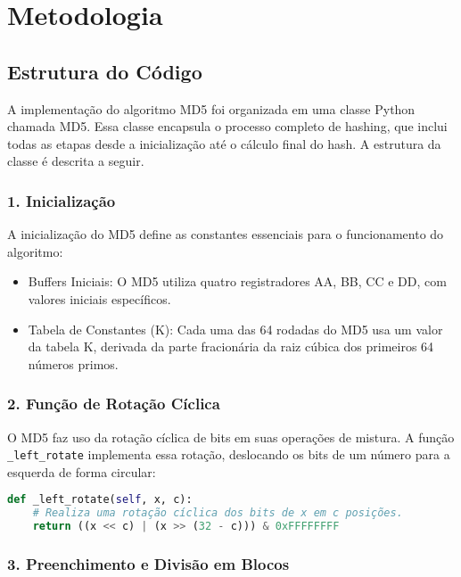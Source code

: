 \documentclass{article}
\begin{document}
\section*{Metodologia}

\subsection*{Estrutura do Código}

A implementação do algoritmo MD5 foi organizada em uma classe Python chamada MD5. Essa classe encapsula o processo completo de hashing, que inclui todas as etapas desde a inicialização até o cálculo final do hash. A estrutura da classe é descrita a seguir.

\subsubsection*{1. Inicialização}

A inicialização do MD5 define as constantes essenciais para o funcionamento do algoritmo:

\begin{itemize}
    \item Buffers Iniciais: O MD5 utiliza quatro registradores AA, BB, CC e DD, com valores iniciais específicos.
    \item Tabela de Constantes (K): Cada uma das 64 rodadas do MD5 usa um valor da tabela K, derivada da parte fracionária da raiz cúbica dos primeiros 64 números primos.
\end{itemize}

\subsubsection*{2. Função de Rotação Cíclica}

O MD5 faz uso da rotação cíclica de bits em suas operações de mistura. A função \texttt{\_left\_rotate} implementa essa rotação, deslocando os bits de um número para a esquerda de forma circular:

\begin{lstlisting}[language=Python]
def _left_rotate(self, x, c):
    # Realiza uma rotação cíclica dos bits de x em c posições.
    return ((x << c) | (x >> (32 - c))) & 0xFFFFFFFF
\end{lstlisting}

\subsubsection*{3. Preenchimento e Divisão em Blocos}
\end{document}
